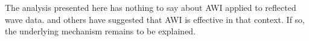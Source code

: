 
The analysis presented here has nothing to say about AWI applied to
reflected wave data. \cite{Warner:16} and others have
suggested that AWI is effective in that context. If so, the underlying
mechanism remains to be explained. 




